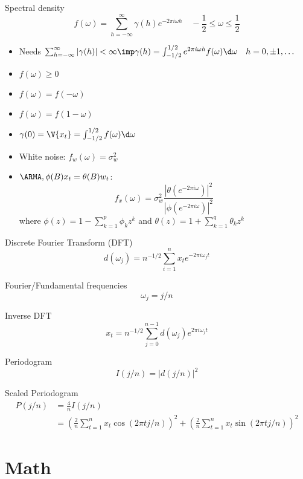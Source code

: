 \documentclass[landscape]{article}
\begin{document}
\begin{multicols*}{2}
Spectral density
\[f(\omega) = \sum_{h=-\infty}^\infty \gamma(h) e^{-2\pi i \omega h}
\quad -\frac{1}{2} \le \omega \le \frac{1}{2}\]
\begin{itemize}
  \item Needs $\sum_{h=-\infty}^\infty |\gamma(h)| < \infty
    \imp \gamma(h) = \int_{-1/2}^{1/2} e^{2\pi i \omega h}f(\omega) \d\omega
    \quad h=0,\pm1,\ldots$
  \item $f(\omega) \ge 0$
  \item $f(\omega) = f(-\omega)$
  \item $f(\omega) = f(1-\omega)$
  \item $\gamma(0) = \V{x_t} = \int_{-1/2}^{1/2}f(\omega)\d\omega$
  \item White noise: $f_w(\omega) = \sigma_w^2$
  \item $\ARMA, \phi(B)x_t = \theta(B)w_t$:
    \[f_x(\omega) = \sigma_w^2 \frac{|\theta(e^{-2\pi i
    \omega})|^2}{|\phi(e^{-2\pi i \omega})|^2}\]
    where $\phi(z) = 1 - \sum_{k=1}^p \phi_k z^k$ and
    $\theta(z) = 1 + \sum_{k=1}^q \theta_k z^k$
\end{itemize}

Discrete Fourier Transform (DFT)
\[d(\omega_j) = n^{-1/2} \sum_{i=1}^n x_t e^{-2\pi i\omega_j t}\]

Fourier/Fundamental frequencies
\[\omega_j = j/n\]

Inverse DFT
\[x_t = n^{-1/2} \sum_{j=0}^{n-1} d(\omega_j) e^{2\pi i\omega_j t}\]

Periodogram
\[I(j/n) = |d(j/n)|^2\]

Scaled Periodogram
\begin{align*}
P(j/n)
&= \frac{4}{n}I(j/n) \\
&=\left( \frac{2}{n} \sum_{t=1}^n x_t \cos(2\pi t j/n) \right)^2
+ \left( \frac{2}{n} \sum_{t=1}^n x_t \sin(2\pi t j/n) \right)^2
\end{align*}

\section{Math}


\end{multicols*}
\end{document}

